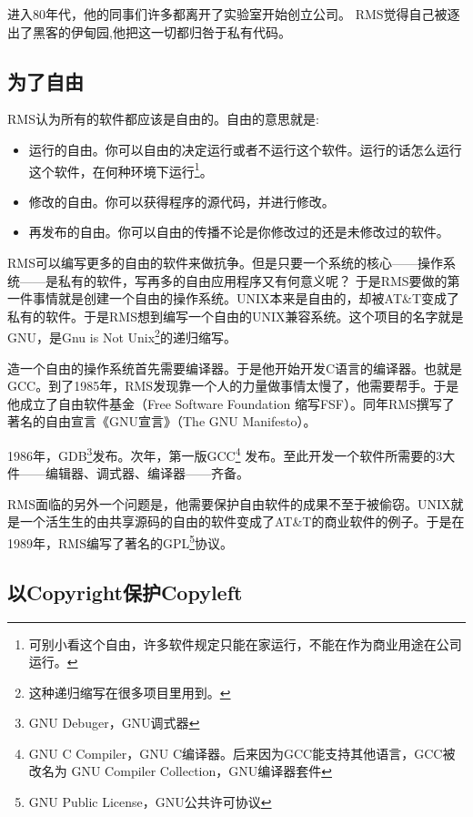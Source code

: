 进入80年代，他的同事们许多都离开了实验室开始创立公司。
RMS觉得自己被逐出了黑客的伊甸园,他把这一切都归咎于私有代码。

\subsection{为了自由}

RMS认为所有的软件都应该是自由的。自由的意思就是:
\begin{itemize}
\item 运行的自由。你可以自由的决定运行或者不运行这个软件。运行的话怎么运行这个软件，在何种环境下运行\footnote{可别小看这个自由，许多软件规定只能在家运行，不能在作为商业用途在公司运行。}。
\item 修改的自由。你可以获得程序的源代码，并进行修改。
\item 再发布的自由。你可以自由的传播不论是你修改过的还是未修改过的软件。
\end{itemize}

RMS可以编写更多的自由的软件来做抗争。但是只要一个系统的核心------操作系统------是私有的软件，写再多的自由应用程序又有何意义呢？
于是RMS要做的第一件事情就是创建一个自由的操作系统。UNIX本来是自由的，却被AT\&T变成了私有的软件。于是RMS想到编写一个自由的UNIX兼容系统。这个项目的名字就是GNU，是Gnu is Not Unix\footnote{这种递归缩写在很多项目里用到。}的递归缩写。

造一个自由的操作系统首先需要编译器。于是他开始开发C语言的编译器。也就是GCC。到了1985年，RMS发现靠一个人的力量做事情太慢了，他需要帮手。于是他成立了自由软件基金（Free Software Foundation 缩写FSF）。同年RMS撰写了著名的自由宣言《GNU宣言》（The GNU Manifesto）。

1986年，GDB\footnote{GNU Debuger，GNU调式器}发布。次年，第一版GCC\footnote{GNU C Compiler，GNU C编译器。后来因为GCC能支持其他语言，GCC被改名为 GNU Compiler Collection，GNU编译器套件} 发布。至此开发一个软件所需要的3大件------编辑器、调式器、编译器------齐备。

RMS面临的另外一个问题是，他需要保护自由软件的成果不至于被偷窃。UNIX就是一个活生生的由共享源码的自由的软件变成了AT\&T的商业软件的例子。于是在1989年，RMS编写了著名的GPL\footnote{GNU Public License，GNU公共许可协议}协议。

\subsection{以Copyright保护Copyleft}

